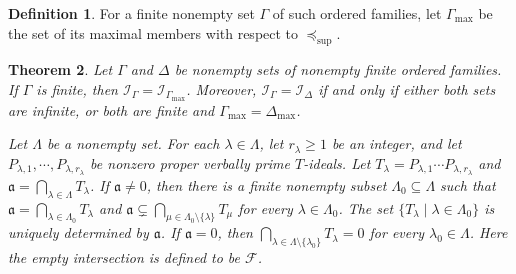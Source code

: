 \documentclass[11pt,reqno]{amsart}
\newcommand{\F}{\mathcal F}
\newtheorem{theorem}{Theorem}[section]
\theoremstyle{definition}
\newtheorem{definition}[theorem]{Definition}
\theoremstyle{remark}
\numberwithin{equation}{section}
\begin{document}
\begin{definition}\label{def:reduced-antichain}
For a finite nonempty set $\Gamma$ of such ordered
families, let $\Gamma_{\max}$ be the set of its maximal
members with respect to $\preceq_{\mathrm{sup}}$.
\end{definition}

\begin{theorem}\label{thm:unique-antichain}
Let $\Gamma$ and $\Delta$ be nonempty sets of nonempty finite
ordered families.
If $\Gamma$ is finite, then
$\mathcal I_\Gamma=\mathcal I_{\Gamma_{\max}}$.
Moreover, $\mathcal I_\Gamma=\mathcal I_\Delta$ if and
only if either both sets are infinite, or both are
finite and $\Gamma_{\max}=\Delta_{\max}$.


Let $\Lambda$ be a nonempty set.
For each $\lambda\in\Lambda$, let $r_\lambda\geq1$
be an integer, and let
$P_{\lambda,1},\cdots,P_{\lambda,r_\lambda}$
be nonzero proper verbally prime $T$-ideals.
Let
$
T_\lambda=P_{\lambda,1}\cdots P_{\lambda,r_\lambda}$ and $
\mathfrak a=\bigcap_{\lambda\in\Lambda}T_\lambda$.
If $\mathfrak a\ne0$, then there is a finite nonempty
subset $\Lambda_0\subseteq\Lambda$ such that
$\mathfrak a=\bigcap_{\lambda\in\Lambda_0}T_\lambda$
and
$\mathfrak a\subsetneq
\bigcap_{\mu\in\Lambda_0\setminus\{\lambda\}}T_\mu$
for every $\lambda\in\Lambda_0$.
The set $\{T_\lambda\mid\lambda\in\Lambda_0\}$
is uniquely determined by $\mathfrak a$.
If $\mathfrak a=0$, then
$
\bigcap_{\lambda\in\Lambda\setminus\{\lambda_0\}}
T_\lambda=0$
for every $\lambda_0\in\Lambda$.
Here the empty intersection is defined to be $\F$.


\end{theorem}
\end{document}
